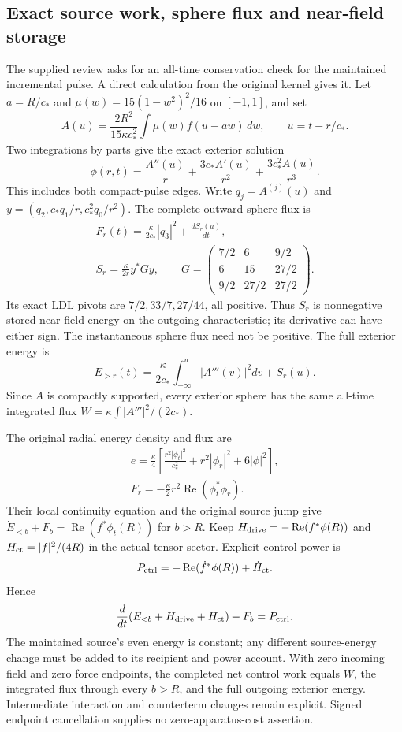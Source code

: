 \subsection{Exact source work, sphere flux and near-field storage}
The supplied review asks for an all-time conservation check for the maintained
incremental pulse. A direct calculation from the original kernel gives it.
Let $a=R/c_*$ and $\mu(w)=15(1-w^2)^2/16$ on $[-1,1]$, and set
\[
 A(u)=\frac{2R^2}{15\kappa c_*^2}
       \int\mu(w)f(u-aw)\,dw,\qquad u=t-r/c_*.
\]
Two integrations by parts give the exact exterior solution
\[
 \phi(r,t)=\frac{A''(u)}r+\frac{3c_*A'(u)}{r^2}
                       +\frac{3c_*^2A(u)}{r^3}.
\]
This includes both compact-pulse edges. Write $q_j=A^{(j)}(u)$ and
$y=(q_2,c_*q_1/r,c_*^2q_0/r^2)$. The complete outward sphere flux is
\[
 \begin{gathered}
 F_r(t)=\frac{\kappa}{2c_*}|q_3|^2+\frac{dS_r(u)}{dt},\\
 S_r=\frac{\kappa}{2r}y^*G y,\qquad
 G=\begin{pmatrix}7/2&6&9/2\\6&15&27/2\\9/2&27/2&27/2\end{pmatrix}.
 \end{gathered}
\]
Its exact LDL pivots are $7/2,33/7,27/44$, all positive. Thus $S_r$ is
nonnegative stored near-field energy on the outgoing characteristic; its
derivative can have either sign. The instantaneous sphere flux need not be
positive. The full exterior energy is
\[
 E_{>r}(t)=\frac{\kappa}{2c_*}\int_{-\infty}^{u}|A'''(v)|^2dv+S_r(u).
\]
Since $A$ is compactly supported, every exterior sphere has the same
all-time integrated flux $W=\kappa\int|A'''|^2/(2c_*)$.

The original radial energy density and flux are
\[
 \begin{gathered}
 e=\frac\kappa4\left[\frac{r^2|\phi_t|^2}{c_*^2}
                     +r^2|\phi_r|^2+6|\phi|^2\right],\\
 F_r=-\frac\kappa2r^2\operatorname{Re}(\phi_t^*\phi_r).
 \end{gathered}
\]
Their local continuity equation and the original source jump give
$\dot E_{<b}+F_b=\operatorname{Re}(f^*\phi_t(R))$ for $b>R$.
Keep $H_{\rm drive}=-\operatorname{Re}(f^*\phi(R))$ and
$H_{\rm ct}=|f|^2/(4R)$ in the actual tensor sector. Explicit control power is
\[
 P_{\rm ctrl}=-\operatorname{Re}(\dot f^*\phi(R))+\dot H_{\rm ct}.
\]
Hence
\[
 \frac d{dt}(E_{<b}+H_{\rm drive}+H_{\rm ct})+F_b=P_{\rm ctrl}.
\]
The maintained source's even energy is constant; any different source-energy
change must be added to its recipient and power account. With zero incoming
field and zero force endpoints, the completed net control work equals $W$,
the integrated flux through every $b>R$, and the full outgoing exterior
energy. Intermediate interaction and counterterm changes remain explicit.
Signed endpoint cancellation supplies no zero-apparatus-cost assertion.

